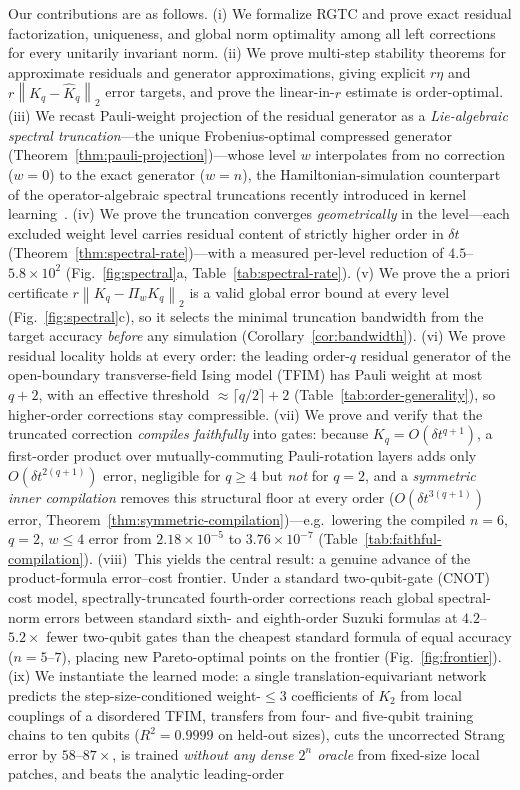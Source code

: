 \documentclass[aps,prxquantum,reprint,superscriptaddress,nofootinbib,amsmath,amssymb]{revtex4-2}
\newcommand{\rgtc}{RGTC}
\newcommand{\tfim}{TFIM}
\newcommand{\norm}[1]{\left\lVert #1 \right\rVert}
\newcommand{\dt}{\delta t}
\begin{document}
Our contributions are as follows. (i) We formalize \rgtc{} and prove exact residual factorization, uniqueness, and global norm optimality among all left corrections for every unitarily invariant norm. (ii) We prove multi-step stability theorems for approximate residuals and generator approximations, giving explicit $r\eta$ and $r\norm{K_q-\widehat K_q}_2$ error targets, and prove the linear-in-$r$ estimate is order-optimal. (iii) We recast Pauli-weight projection of the residual generator as a \emph{Lie-algebraic spectral truncation}---the unique Frobenius-optimal compressed generator (Theorem~\ref{thm:pauli-projection})---whose level $w$ interpolates from no correction ($w=0$) to the exact generator ($w=n$), the Hamiltonian-simulation counterpart of the operator-algebraic spectral truncations recently introduced in kernel learning~\cite{hashimoto2024spectral,hashimoto2023rkhm}. (iv) We prove the truncation converges \emph{geometrically} in the level---each excluded weight level carries residual content of strictly higher order in $\dt$ (Theorem~\ref{thm:spectral-rate})---with a measured per-level reduction of $4.5$--$5.8\times10^{2}$ (Fig.~\ref{fig:spectral}a, Table~\ref{tab:spectral-rate}). (v) We prove the a priori certificate $r\norm{K_q-\Pi_wK_q}_2$ is a valid global error bound at every level (Fig.~\ref{fig:spectral}c), so it selects the minimal truncation bandwidth from the target accuracy \emph{before} any simulation (Corollary~\ref{cor:bandwidth}). (vi) We prove residual locality holds at every order: the leading order-$q$ residual generator of the open-boundary transverse-field Ising model (\tfim{}) has Pauli weight at most $q+2$, with an effective threshold $\approx\lceil q/2\rceil+2$ (Table~\ref{tab:order-generality}), so higher-order corrections stay compressible. (vii) We prove and verify that the truncated correction \emph{compiles faithfully} into gates: because $K_q=O(\dt^{q+1})$, a first-order product over mutually-commuting Pauli-rotation layers adds only $O(\dt^{2(q+1)})$ error, negligible for $q\ge4$ but \emph{not} for $q=2$, and a \emph{symmetric inner compilation} removes this structural floor at every order ($O(\dt^{3(q+1)})$ error, Theorem~\ref{thm:symmetric-compilation})---e.g.\ lowering the compiled $n=6$, $q=2$, $w\le4$ error from $2.18\times10^{-5}$ to $3.76\times10^{-7}$ (Table~\ref{tab:faithful-compilation}). (viii)~This yields the central result: a genuine advance of the product-formula error--cost frontier. Under a standard two-qubit-gate (CNOT) cost model, spectrally-truncated fourth-order corrections reach global spectral-norm errors between standard sixth- and eighth-order Suzuki formulas at $4.2$--$5.2\times$ fewer two-qubit gates than the cheapest standard formula of equal accuracy ($n=5$--$7$), placing new Pareto-optimal points on the frontier (Fig.~\ref{fig:frontier}). (ix) We instantiate the learned mode: a single translation-equivariant network predicts the step-size-conditioned weight-$\leq3$ coefficients of $K_2$ from local couplings of a disordered \tfim{}, transfers from four- and five-qubit training chains to ten qubits ($R^2=0.9999$ on held-out sizes), cuts the uncorrected Strang error by $58$--$87\times$, is trained \emph{without any dense $2^n$ oracle} from fixed-size local patches, and beats the analytic leading-order 
\end{document}
